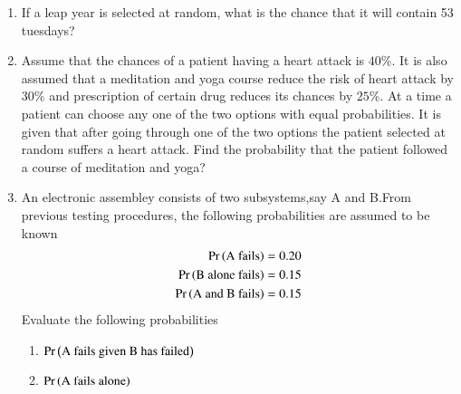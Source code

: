 \begin{enumerate}[resume*]
\begin{enumerate}
 \item
\begin{table}[h! ]
  \label{tab:ncert/12/13/4/1/2}
  \caption{}
  
\end{table}

\item
\begin{table}[h]
  \caption{}
  \label{tab:ncert/12/13/4/1/3}
  
\end{table}

\item
\begin{table}[h]
  \caption{}
  \label{tab:ncert/12/13/4/1/4}
  
\end{table}
\end{enumerate}
\solution

\item If a leap year is selected at random, what is the chance that it will contain 53 tuesdays?
	\\
		\solution
		
	\item Assume that the chances of a patient having a heart attack is $40\%$. It is also assumed that a meditation and yoga course reduce the risk of heart attack by $30\%$ and prescription of certain drug reduces its chances by $25\%$. At a time a patient can choose any one of the two options with equal probabilities. It is given that after going through one of the two options the patient selected at random suffers a heart attack. Find the probability that the patient followed a course of meditation and yoga?
	\\
		\solution
		
	\item An electronic assembley consists of two subsystems,say A and B.From previous testing procedures, the following probabilities are assumed to be known
\begin{align}
\Pr\left(\text{A fails}\right)&=0.20
\\ \Pr\left(\text{B alone fails}\right)&=0.15
\\ \Pr\left(\text{A  and B fails}\right)&=0.15
\end{align}
 Evaluate the following probabilities
 \begin{enumerate}
 \item $\Pr\left(\text{A fails given B has failed}\right)$
 \item $\Pr\left(\text{A fails alone}\right)$
\end{enumerate}
		\solution

\end{enumerate}
